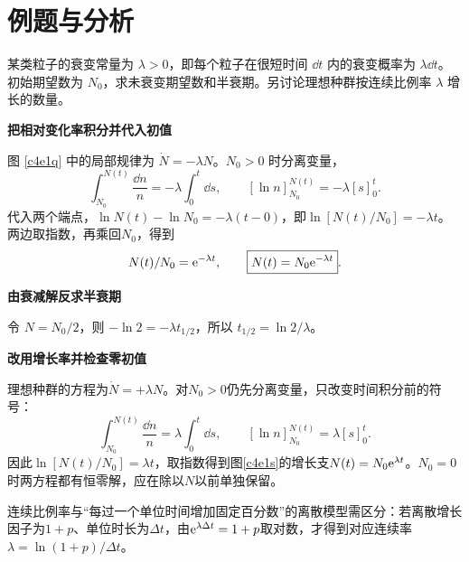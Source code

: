 \section{例题与分析}
\begin{question}
\begin{example}[指数衰减与指数增长]
某类粒子的衰变常量为 $\lambda>0$，即每个粒子在很短时间 $\dd t$ 内的衰变概率为 $\lambda\dd t$。初始期望数为 $N_0$，求未衰变期望数和半衰期。另讨论理想种群按连续比例率 $\lambda$ 增长的数量。
\end{example}
\end{question}
\begin{solution}\textbf{把相对变化率积分并代入初值}\par\nobreak
图 \ref{c4e1q} 中的局部规律为 $\dot N=-\lambda N$。$N_0>0$ 时分离变量，
\[
 \int_{N_0}^{N(t)}\frac{\dd n}{n}
 =-\lambda\int_0^t\dd s,
 \qquad [\ln n]_{N_0}^{N(t)}=-\lambda[s]_0^t.
\]
代入两个端点，$\ln N(t)-\ln N_0=-\lambda(t-0)$，即$\ln[N(t)/N_0]=-\lambda t$。两边取指数，再乘回$N_0$，得到
\[
N(t)/N_0=\mathrm e^{-\lambda t},\qquad\boxed{N(t)=N_0\mathrm e^{-\lambda t}}.
\]

\par\medskip{}\noindent\textbf{由衰减解反求半衰期}\par\nobreak
令 $N=N_0/2$，则 $-\ln2=-\lambda t_{1/2}$，所以 $t_{1/2}=\ln2/\lambda$。


\par\medskip{}\noindent\textbf{改用增长率并检查零初值}\par\nobreak
理想种群的方程为$\dot N=+\lambda N$。对$N_0>0$仍先分离变量，只改变时间积分前的符号：
\[
\int_{N_0}^{N(t)}\frac{\dd n}{n}=\lambda\int_0^t\dd s,
\qquad[\ln n]_{N_0}^{N(t)}=\lambda[s]_0^t.
\]
因此$\ln[N(t)/N_0]=\lambda t$，取指数得到图\ref{c4e1s}的增长支$N(t)=N_0\mathrm e^{\lambda t}$。$N_0=0$时两方程都有恒零解，应在除以$N$以前单独保留。

连续比例率与“每过一个单位时间增加固定百分数”的离散模型需区分：若离散增长因子为$1+p$、单位时长为$\Delta t$，由$\mathrm e^{\lambda\Delta t}=1+p$取对数，才得到对应连续率$\lambda=\ln(1+p)/\Delta t$。
\end{solution}

